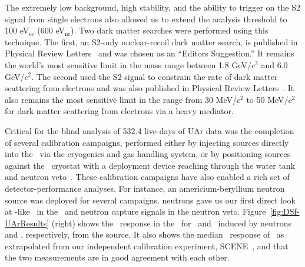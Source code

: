 The extremely low background, high stability, and the ability to trigger on the S2 signal from single electrons also allowed us to extend the analysis threshold to 100 eV$_\text{ee}$ (600 eV$_\text{nr}$). Two dark matter searches were performed using this technique. The first, an S2-only nuclear-recoil dark matter search, is published in Physical Review Letters~\cite{Agnes:2018fg} and was chosen as an ``Editors Suggestion.'' It remains the world's most sensitive limit in the mass range between 1.8 GeV/$c^2$ and 6.0 GeV/$c^2$. The second used the S2 signal to constrain the rate of dark matter scattering from electrons and was also published in Physical Review Letters~\cite{Agnes:2018ft}. It also remains the most sensitive limit in the range from 30 MeV/$c^2$ to 50 MeV/$c^2$ for dark matter scattering from electrons via a heavy mediator.


Critical for the blind analysis of 532.4 live-days of UAr data was the completion of several calibration campaigns, performed either by injecting sources directly into the \LAr\ via the cryogenics and gas handling system, or by positioning sources against the \LArTPC\ cryostat with a deployment device reaching through the water tank and neutron veto~\cite{Agnes:2017ec}. These calibration campaigns have also enabled a rich set of detector-performance analyses.  For instance, an americium-beryllium neutron source was deployed for several campaigns.   neutrons gave us our first direct look at \WIMP-like \NRs\ in the \LArTPC\ and neutron capture signals in the neutron veto.  Figure~\ref{fig:DSf-UArResults} (right) shows the \FNine\ response in the \LArTPC\ for \NRs\ and \ERs\ induced by neutrons and \grs, respectively, from the  source. It also shows the median \FNine\ response of \NRs\ as extrapolated from our independent calibration experiment, SCENE~\cite{Cao:2015ks}, and that the two measurements are in good agreement with each other.

